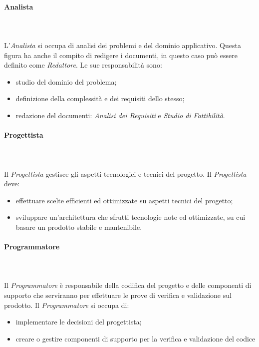 \paragraph{Analista}\mbox{} \\ \mbox{} \\
L'\textit{Analista} si occupa di analisi dei problemi e del dominio applicativo. Questa figura ha anche il compito di redigere i documenti, in questo caso può essere definito come \textit{Redattore}.
Le sue responsabilità sono:
\begin{itemize}
	\item studio del dominio del problema;
	\item definizione della complessità e dei requisiti dello stesso;
	\item redazione del documenti:\textit{ Analisi dei Requisiti} e \textit{Studio di Fattibilità}.
\end{itemize}

\paragraph{Progettista}\mbox{} \\ \mbox{} \\
Il \textit{Progettista} gestisce gli aspetti tecnologici e tecnici del progetto.
Il \textit{Progettista} deve:
\begin{itemize}
	\item effettuare scelte efficienti ed ottimizzate su aspetti tecnici del progetto;
	\item sviluppare un'architettura che sfrutti tecnologie note ed ottimizzate, su cui basare un prodotto stabile e mantenibile.
\end{itemize}

\paragraph{Programmatore}\mbox{} \\ \mbox{} \\
Il \textit{Programmatore} è responsabile della codifica del progetto e delle componenti di supporto che serviranno per effettuare le prove di verifica e validazione sul prodotto.
Il \textit{Programmatore} si occupa di:
\begin{itemize}
	\item implementare le decisioni del progettista;
	\item creare o gestire componenti di supporto per la verifica e validazione del codice
\end{itemize}

